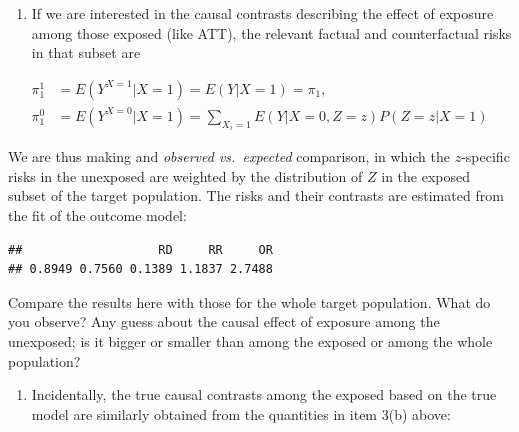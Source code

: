 \documentclass[
]{book}
\newenvironment{Shaded}{\begin{snugshade}}{\end{snugshade}}
\newcommand{\DecValTok}[1]{\textcolor[rgb]{0.00,0.00,0.81}{#1}}
\newcommand{\FunctionTok}[1]{\textcolor[rgb]{0.13,0.29,0.53}{\textbf{#1}}}
\newcommand{\NormalTok}[1]{#1}
\newcommand{\OtherTok}[1]{\textcolor[rgb]{0.56,0.35,0.01}{#1}}
\newcommand{\SpecialCharTok}[1]{\textcolor[rgb]{0.81,0.36,0.00}{\textbf{#1}}}
\providecommand{\tightlist}{%
  \setlength{\itemsep}{0pt}\setlength{\parskip}{0pt}}
\begin{document}
\begin{enumerate}
\def\labelenumi{\arabic{enumi}.}
\setcounter{enumi}{4}
\tightlist
\item
  If we are interested in the causal contrasts describing the effect
  of exposure among those exposed (like ATT), the relevant factual and
  counterfactual risks in that subset are
\end{enumerate}

\[
\begin{aligned}
 \pi^1_1 & = E(Y^{X=1}|X=1) = E(Y|X=1) = \pi_1, \\
 \pi^0_1 & = E(Y^{X=0}|X=1) = \sum_{X_i=1} E(Y|X=0, Z=z)P(Z=z|X=1)
\end{aligned}
\]

We are thus making and \emph{observed vs.~expected} comparison, in which the
\(z\)-specific risks in the unexposed are weighted by the distribution of
\(Z\) in the exposed subset of the target population. The risks and their
contrasts are estimated from the fit of the outcome model:

\begin{Shaded}
\end{Shaded}

\begin{verbatim}
##                   RD     RR     OR 
## 0.8949 0.7560 0.1389 1.1837 2.7488
\end{verbatim}

Compare the results here with those for the whole target population.
What do you observe? Any guess about the causal effect of exposure among
the unexposed; is it bigger or smaller than among the exposed or among
the whole population?

\begin{enumerate}
\def\labelenumi{\arabic{enumi}.}
\tightlist
\item
  Incidentally, the true causal contrasts among the exposed based on
  the true model are similarly obtained from the quantities in item
  3(b) above:
\end{enumerate}
\end{document}
